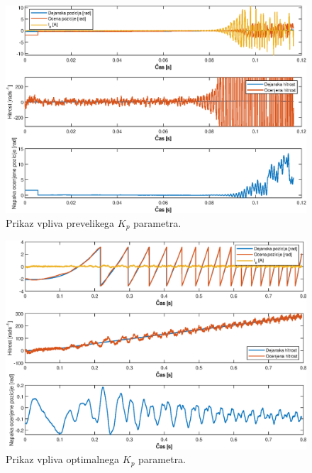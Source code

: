 \documentclass[a4paper,twoside,openright,12pt,slovene]{book}
\begin{document}
\begin{figure}[!htbp]
    \centering
    \includegraphics[width=1\columnwidth]{Slike/PItuning_Kp_unstableHigh.eps}
    \caption{\label{PItuning_Kp_unstableHigh} Prikaz vpliva prevelikega $K_p$ parametra. }
\end{figure}

\begin{figure}[!htbp]
    \centering
    \includegraphics[width=1\columnwidth]{Slike/PItuning_Kp_stable.eps}
    \caption{\label{PItuning_Kp_stable} Prikaz vpliva optimalnega $K_p$ parametra. }
\end{figure}
\end{document}
